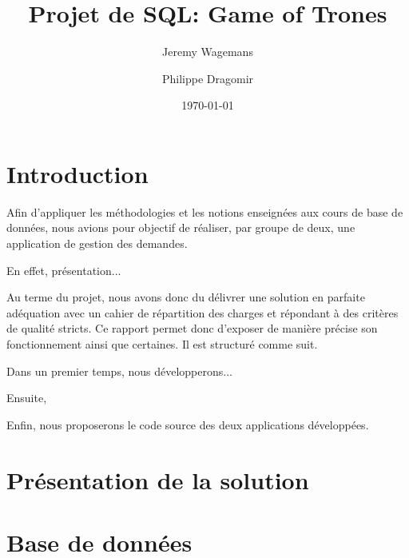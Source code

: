 \documentclass[11pt,a4paper]{report}
\title{Projet de SQL: Game of Trones}
\author{Jeremy Wagemans \and Philippe Dragomir}
\date{\today}
\begin{document}

\maketitle

\tableofcontents

\begingroup
\setlength{\parskip}{\baselineskip}
\chapter{Introduction}

Afin d’appliquer les méthodologies et les notions enseignées aux cours de base de données, nous avions pour objectif de réaliser, par groupe de deux, une application de gestion des demandes.
\par

En effet, présentation...
\par

Au terme du projet, nous avons donc du délivrer une solution en parfaite adéquation avec un cahier de répartition des charges et répondant à des critères de qualité stricts. Ce rapport permet donc d’exposer de manière précise son fonctionnement ainsi que certaines. Il est structuré comme suit.
\par

Dans un premier temps, nous développerons...
\par

Ensuite,
\par

Enfin, nous proposerons le code source des deux applications développées.
\par

\endgroup

\setlength{\parskip}{0pt}

\chapter{Présentation de la solution}

\chapter{Base de données}
\end{document}
